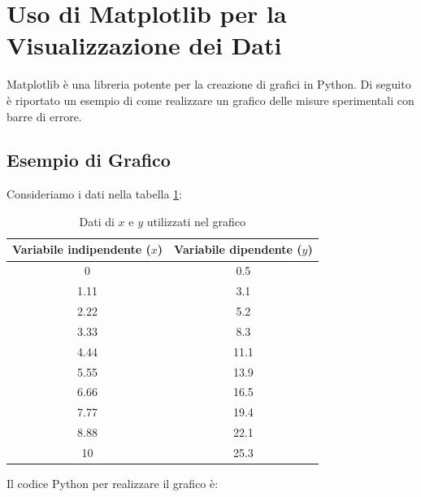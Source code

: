 \documentclass[a4paper,12pt]{article}
\begin{document}
\section{Uso di Matplotlib per la Visualizzazione dei Dati}

Matplotlib è una libreria potente per la creazione di grafici in Python. Di seguito è riportato un esempio di come realizzare un grafico delle misure sperimentali con barre di errore.

\subsection{Esempio di Grafico}

Consideriamo  i  dati nella tabella \ref{tab:datia}:

\begin{table}[!h]
    \centering
    \begin{tabular}{|c|c|}
        \hline
        \textbf{Variabile indipendente (\(x\))} & \textbf{Variabile dipendente (\(y\))} \\
        \hline
        0 & 0.5 \\
        1.11 & 3.1 \\
        2.22 & 5.2 \\
        3.33 & 8.3 \\
        4.44 & 11.1 \\
        5.55 & 13.9 \\
        6.66 & 16.5 \\
        7.77 & 19.4 \\
        8.88 & 22.1 \\
        10 & 25.3 \\
        \hline
    \end{tabular}
    \caption{Dati di \(x\) e \(y\) utilizzati nel grafico}
    \label{tab:datia}
\end{table}

Il codice Python per realizzare il grafico è:
\end{document}
